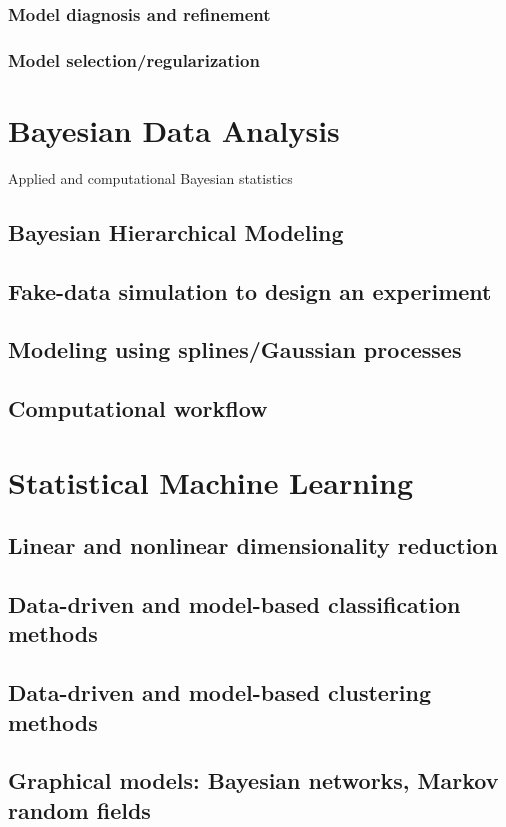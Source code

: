 \documentclass{article}
\begin{document}
\subsubsection{Model diagnosis and refinement}
\subsubsection{Model selection/regularization}

\section{Bayesian Data Analysis}
Applied and computational Bayesian statistics
\subsection{Bayesian Hierarchical Modeling}
\subsection{Fake-data simulation to design an experiment}
\subsection{Modeling using splines/Gaussian processes}
\subsection{Computational workflow}

\section{Statistical Machine Learning}
\subsection{Linear and nonlinear dimensionality reduction}
\subsection{Data-driven and model-based classification methods}
\subsection{Data-driven and model-based clustering methods}
\subsection{Graphical models: Bayesian networks, Markov random fields}
\end{document}
